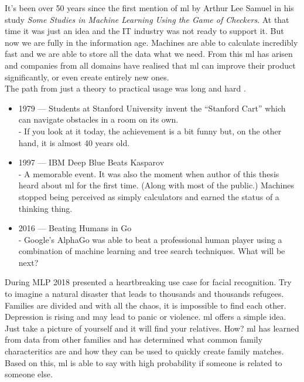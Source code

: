 \documentclass[thesis=M,english]{FITthesis}[2012/06/26]
\begin{document}
It's been over 50 years since the first mention of \acrshort{ml} by Arthur Lee Samuel in his study \textit{Some Studies in Machine Learning Using the Game of Checkers}\cite{ml_first_occurence}. At that time it was just an idea and the IT industry was not ready to support it. But now we are fully in the information age. Machines are able to calculate incredibly fast and we are able to store all the data what we need. From this \acrshort{ml} has arisen and companies from all domains have realised that \acrshort{ml} can improve their product significantly, or even create entirely new ones.\\

The path from just a theory to practical usage was long and hard \cite{ml_history}.\\

\begin{itemize}[nosep]
	\item 1979 — Students at Stanford University invent the “Stanford Cart” which can navigate obstacles in a room on its own.\\
	- If you look at it today, the achievement is a bit funny but, on the other hand, it is almost 40 years old.
	\item 1997 — IBM Deep Blue Beats Kasparov\\
	- A memorable event. It was also the moment when author of this thesis heard about \acrshort{ml} for the first time. (Along with most of the public.) Machines stopped being perceived as simply calculators and earned the status of a thinking thing.
	\item 2016 — Beating Humans in Go\\
	 - Google's AlphaGo was able to beat a professional human player using a combination of machine learning and tree search techniques. What will be next? 
\end{itemize}

\pagebreak
During MLP 2018 \cite{mlp2018_microsoft} presented a heartbreaking use case for facial recognition. Try to imagine a natural disaster that leads to thousands and thousands refugees. Families are divided and with all the chaos, it is impossible to find each other. Depression is rising and may lead to panic or violence. \acrshort{ml} offers a simple idea. Just take a picture of yourself and it will find your relatives. How? \acrshort{ml} has learned from data from other families and has determined what common family characteritics are and how they can be used to quickly create family matches. Based on this, \acrshort{ml} is able to say with high probability if someone is related to someone else. \\
\end{document}
